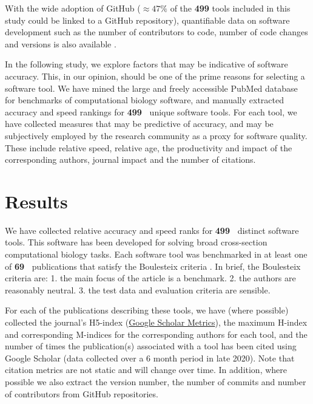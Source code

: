 \documentclass[fleqn,10pt]{SelfArx} %
\def\numTools{499}
\def\numBenchmarkPubs{69}
\begin{document}
With the wide adoption of GitHub ($\approx 47\%$ of the
\textbf{{\color{red}\numTools}} tools included in this study could be
linked to a GitHub repository), quantifiable data on software
development such as the number of contributors to code, number of code
changes and versions is also available
\cite{ray2014large,Dozmorov:2018,mangul2018comprehensive}.

In the following study, we explore factors that may be indicative of
software accuracy. This, in our opinion, should be one of the prime
reasons for selecting a software tool. We have mined the large and
freely accessible PubMed database \cite{Sayers2010-vm} for benchmarks
of computational biology software, and manually extracted accuracy and
speed rankings for \textbf{{\color{red}\numTools~}} unique software tools. For
each tool, we have collected measures that may be predictive
of accuracy, and may be subjectively employed by the research
community as a proxy for software quality. These include relative
speed, relative age, the productivity and impact of the corresponding
authors, journal impact and the number of citations.

\section*{Results}
We have collected relative accuracy and speed ranks for
\textbf{{\color{red}\numTools~}} distinct software tools. This software has
been developed for solving broad cross-section computational biology
tasks.
Each software tool was benchmarked in at least one of
\textbf{{\color{red}\numBenchmarkPubs~}} publications that satisfy the Boulesteix
criteria \cite{Boulesteix2013-vb}. In brief, the Boulesteix criteria
are: 1. the main focus of the article is a benchmark. 2. the authors
are reasonably neutral. 3. the test data and evaluation criteria are
sensible.

For each of the publications describing these tools, we have (where
possible) collected the journal's H5-index (\href{https://scholar.google.co.nz/citations?view\_op=top\_venues\&hl=en}{Google
  Scholar Metrics}), the maximum H-index and
corresponding M-indices \cite{Hirsch2005-mt} for the corresponding
authors for each tool, and the number of times the publication(s)
associated with a tool has been cited using Google Scholar (data
collected over a 6 month period in late 2020). Note that citation metrics
are not static and will change over time. In addition, where possible we also extract the version number, the number
of commits and number of contributors from GitHub repositories.  
\end{document}
